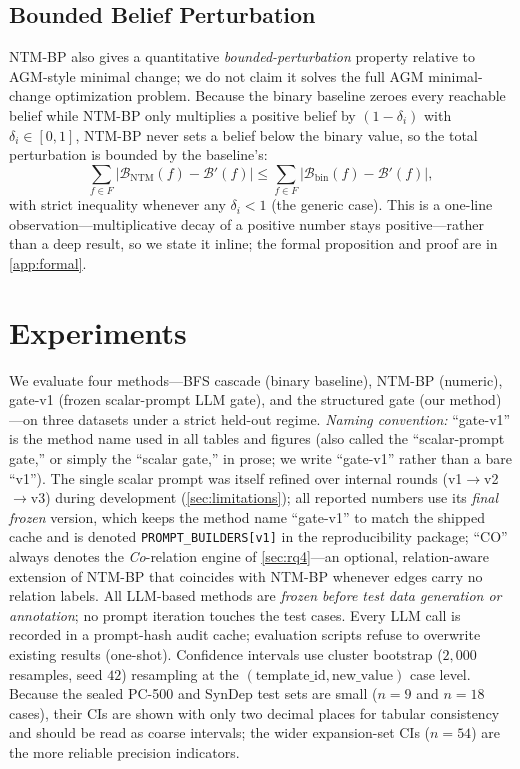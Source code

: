 \documentclass{article}
\theoremstyle{definition}
\begin{document}
\subsection{Bounded Belief Perturbation}

NTM-BP also gives a quantitative \emph{bounded-perturbation} property
relative to AGM-style minimal change; we do not claim it solves the full
AGM minimal-change optimization problem.
Because the binary baseline zeroes every reachable belief while NTM-BP
only multiplies a positive belief by $(1-\delta_i)$ with
$\delta_i\in[0,1]$, NTM-BP never sets a belief below the binary value, so
the total perturbation is bounded by the baseline's:
\begin{equation}
  \sum_{f\in F}|\mathcal{B}_{\text{NTM}}(f)-\mathcal{B}'(f)|
  \leq \sum_{f\in F}|\mathcal{B}_{\text{bin}}(f)-\mathcal{B}'(f)|,
  \label{eq:agm}
\end{equation}
with strict inequality whenever any $\delta_i<1$ (the generic case).  This
is a one-line observation---multiplicative decay of a positive number
stays positive---rather than a deep result, so we state it inline; the
formal proposition and proof are in \cref{app:formal}.

\section{Experiments}
\label{sec:experiments}

We evaluate four methods---BFS cascade (binary baseline), NTM-BP
(numeric), gate-v1 (frozen scalar-prompt LLM gate), and the structured
gate (our method)---on three datasets under a strict held-out regime.
\emph{Naming convention:} ``gate-v1'' is the method name used in all
tables and figures (also called the ``scalar-prompt gate,'' or simply
the ``scalar gate,'' in prose; we write ``gate-v1'' rather than a bare
``v1'').  The single scalar prompt was itself refined over internal
rounds (v1$\to$v2$\to$v3) during development (\cref{sec:limitations});
all reported numbers use its \emph{final frozen} version, which keeps the
method name ``gate-v1'' to match the shipped cache and is denoted
\texttt{PROMPT\_BUILDERS[v1]} in the reproducibility package;
``CO'' always denotes the \emph{Co}-relation engine of
\cref{sec:rq4}---an optional, relation-aware extension of NTM-BP
that coincides with NTM-BP whenever edges carry no relation labels.
All LLM-based methods are \emph{frozen before test data generation or
annotation}; no prompt iteration touches the test cases.  Every LLM
call is recorded in a prompt-hash audit cache; evaluation scripts
refuse to overwrite existing results (one-shot).  Confidence intervals
use cluster bootstrap ($2{,}000$ resamples, seed $42$) resampling at
the $(\text{template\_id},\text{new\_value})$ case level.  Because the
sealed PC-500 and SynDep test sets are small ($n=9$ and $n=18$ cases),
their CIs are shown with only two decimal places for tabular
consistency and should be read as coarse intervals; the wider expansion-set CIs
($n=54$) are the more reliable precision indicators.
\end{document}
